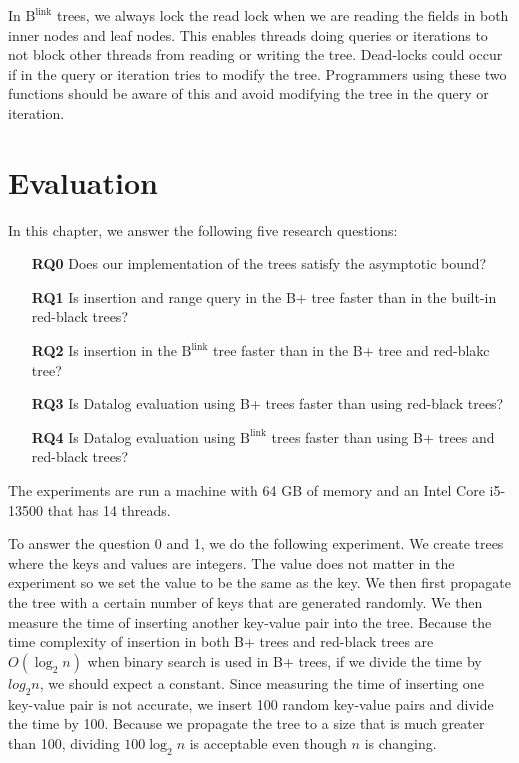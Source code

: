 \documentclass[11pt]{report}
\theoremstyle{definition}
\begin{document}
In $\text{B}^{\text{link}}$ trees, we always lock the read lock when we are reading the fields in both inner nodes and leaf nodes. This enables threads doing queries or iterations to not block other threads from reading or writing the tree. Dead-locks could occur if in the query or iteration tries to modify the tree. Programmers using these two functions should be aware of this and avoid modifying the tree in the query or iteration.


\chapter{Evaluation}
\label{ch:evaluation}

In this chapter, we answer the following five research questions:

\begin{itemize}
  \item[\textbf{RQ0}] Does our implementation of the trees satisfy the asymptotic bound?
  \item[\textbf{RQ1}] Is insertion and range query in the B+ tree faster than in the built-in red-black trees?
  \item[\textbf{RQ2}] Is insertion in the $\text{B}^{\text{link}}$ tree faster than in the B+ tree and red-blakc tree?
  \item[\textbf{RQ3}] Is Datalog evaluation using B+ trees faster than using red-black trees?
  \item[\textbf{RQ4}] Is Datalog evaluation using $\text{B}^{\text{link}}$ trees faster than using B+ trees and red-black trees?
\end{itemize}

The experiments are run a machine with 64 GB of memory and an Intel Core i5-13500 that has 14 threads.

To answer the question 0 and 1, we do the following experiment. We create trees where the keys and values are integers. The value does not matter in the experiment so we set the value to be the same as the key. We then first propagate the tree with a certain number of keys that are generated randomly. We then measure the time of inserting another key-value pair into the tree. Because the time complexity of insertion in both B+ trees and red-black trees are $O(\log_2 n)$ when binary search is used in B+ trees, if we divide the time by $log_2 n$, we should expect a constant. Since measuring the time of inserting one key-value pair is not accurate, we insert 100 random key-value pairs and divide the time by 100. Because we propagate the tree to a size that is much greater than 100, dividing $100 \log_2 n$ is acceptable even though $n$ is changing.
\end{document}
